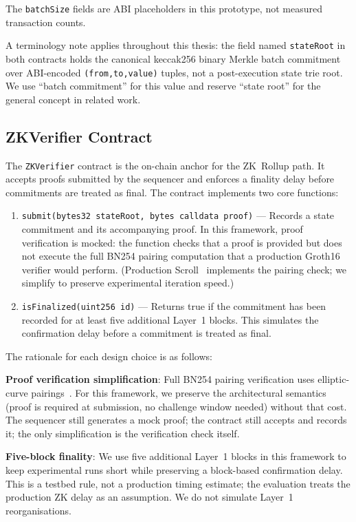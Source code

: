 The \texttt{batchSize} fields are ABI placeholders in this prototype, not measured transaction counts.

A terminology note applies throughout this thesis: the field named \texttt{stateRoot} in both contracts holds the canonical keccak256 binary Merkle batch commitment over ABI-encoded \texttt{(from,to,value)} tuples, not a post-execution state trie root. We use ``batch commitment'' for this value and reserve ``state root'' for the general concept in related work.

\subsection{ZKVerifier Contract}

The \texttt{ZKVerifier} contract is the on-chain anchor for the ZK~Rollup path. It accepts proofs submitted by the sequencer and enforces a finality delay before commitments are treated as final. The contract implements two core functions:

\begin{enumerate}
    \item \texttt{submit(bytes32 stateRoot, bytes calldata proof)} — Records a state commitment and its accompanying proof. In this framework, proof verification is mocked: the function checks that a proof is provided but does not execute the full BN254 pairing computation that a production Groth16 verifier would perform. (Production Scroll~\cite{scroll2023} implements the pairing check; we simplify to preserve experimental iteration speed.)

    \item \texttt{isFinalized(uint256 id)} — Returns true if the commitment has been recorded for at least five additional Layer~1 blocks. This simulates the confirmation delay before a commitment is treated as final.
\end{enumerate}

The rationale for each design choice is as follows:

\textbf{Proof verification simplification}: Full BN254 pairing verification uses elliptic-curve pairings~\cite{groth2016size}. For this framework, we preserve the architectural semantics (proof is required at submission, no challenge window needed) without that cost. The sequencer still generates a mock proof; the contract still accepts and records it; the only simplification is the verification check itself.

\textbf{Five-block finality}: We use five additional Layer~1 blocks in this framework to keep experimental runs short while preserving a block-based confirmation delay. This is a testbed rule, not a production timing estimate; the evaluation treats the production ZK delay as an assumption. We do not simulate Layer~1 reorganisations.

